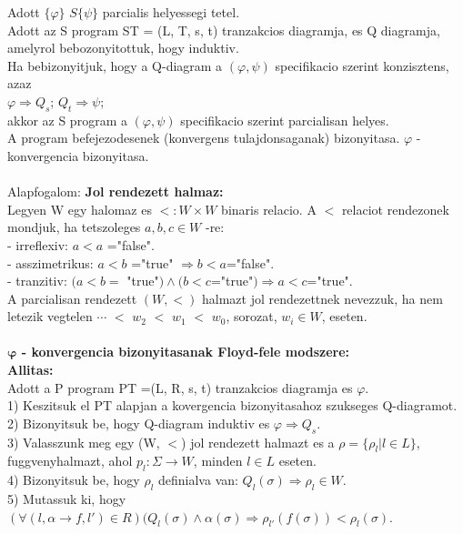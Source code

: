 \documentclass[a4paper,10pt]{article}
\begin{document}
Adott $\lbrace\varphi\rbrace$ $S\lbrace\psi\rbrace$ parcialis helyessegi tetel.\\
Adott az S program ST = (L, T, s, t) tranzakcios diagramja, es Q diagramja, amelyrol bebozonyitottuk, hogy induktiv.\\
Ha bebizonyitjuk, hogy a Q-diagram a $(\varphi,\psi)$ specifikacio szerint konzisztens, azaz\\
$\varphi \Rightarrow Q_s$; $Q_t \Rightarrow \psi$;\\
akkor az S program a $(\varphi, \psi)$ specifikacio szerint parcialisan helyes.\\
A program befejezodesenek (konvergens tulajdonsaganak) bizonyitasa. $\varphi$ - konvergencia bizonyitasa.\\ \\
Alapfogalom: \textbf{Jol rendezett halmaz:}\\
Legyen W egy halomaz es $<:W\times W$ binaris relacio. A $<$ relaciot rendezonek mondjuk, ha
tetszoleges $a,b,c \in W$ -re:\\
- irreflexiv: $a < a$ ="false".\\
- asszimetrikus: $a<b$ ="true" $\Rightarrow b<a$="false".\\
- tranzitiv: $(a<b =$ "true"$) \wedge (b<c$="true"$) \Rightarrow a<c$="true".\\
A parcialisan rendezett $(W, <)$ halmazt jol rendezettnek nevezzuk, ha nem letezik vegtelen $\cdots$ $<$ $w_2$ $<$ $w_1$ $<$ $w_0$, sorozat, $w_i\in W$, eseten.\\ \\
\textbf{$\mathbf{\varphi}$ - konvergencia bizonyitasanak Floyd-fele modszere:}\\
\textbf{Allitas:}\\
Adott a P program PT =(L, R, s, t) tranzakcios diagramja es $\varphi$.\\
1) Keszitsuk el PT alapjan a kovergencia bizonyitasahoz szukseges Q-diagramot.\\
2) Bizonyitsuk be, hogy Q-diagram induktiv es $\varphi \Rightarrow Q_s$.\\
3) Valasszunk meg egy (W, $<$) jol rendezett halmazt es a $\rho=\lbrace\rho_l\vert l\in L\rbrace$, fuggvenyhalmazt, ahol $p_l:\Sigma \to W$, minden $l\in L$ eseten.\\
4) Bizonyitsuk be, hogy $\rho_l$ definialva van: $Q_l(\sigma) \Rightarrow \rho_l\in W$.\\
5) Mutassuk ki, hogy $(\forall(l, \alpha\to f, l')\in R)(Q_l(\sigma)\wedge\alpha(\sigma)\Rightarrow\rho_{l'}(f(\sigma))<\rho_l(\sigma)$.\\
\end{document}
